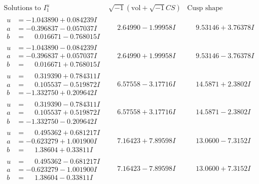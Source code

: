 \documentclass[1p]{elsarticle_modified}
\theoremstyle{definition}
\newcommand{\I}{\sqrt{-1}}
\begin{document}
$$\begin{array}{c|c|c}  
\text{Solutions to }I^u_{1}& \I (\text{vol} + \sqrt{-1}CS) & \text{Cusp shape}\\
 \hline 
\begin{aligned}
u &= -1.043890 + 0.084239 I \\
a &= -0.396837 - 0.057037 I \\
b &= \phantom{-}0.016671 - 0.768015 I\end{aligned}
 & \phantom{-}2.64990 - 1.99958 I & \phantom{-}9.53146 + 3.76378 I \\ \hline\begin{aligned}
u &= -1.043890 - 0.084239 I \\
a &= -0.396837 + 0.057037 I \\
b &= \phantom{-}0.016671 + 0.768015 I\end{aligned}
 & \phantom{-}2.64990 + 1.99958 I & \phantom{-}9.53146 - 3.76378 I \\ \hline\begin{aligned}
u &= \phantom{-}0.319390 + 0.784311 I \\
a &= \phantom{-}0.105537 - 0.519872 I \\
b &= -1.332750 + 0.209642 I\end{aligned}
 & \phantom{-}6.57558 - 3.17716 I & \phantom{-}14.5871 + 2.3802 I \\ \hline\begin{aligned}
u &= \phantom{-}0.319390 - 0.784311 I \\
a &= \phantom{-}0.105537 + 0.519872 I \\
b &= -1.332750 - 0.209642 I\end{aligned}
 & \phantom{-}6.57558 + 3.17716 I & \phantom{-}14.5871 - 2.3802 I \\ \hline\begin{aligned}
u &= \phantom{-}0.495362 + 0.681217 I \\
a &= -0.623279 + 1.001900 I \\
b &= \phantom{-}1.38604 + 0.33811 I\end{aligned}
 & \phantom{-}7.16423 + 7.89598 I & \phantom{-}13.0600 - 7.3152 I \\ \hline\begin{aligned}
u &= \phantom{-}0.495362 - 0.681217 I \\
a &= -0.623279 - 1.001900 I \\
b &= \phantom{-}1.38604 - 0.33811 I\end{aligned}
 & \phantom{-}7.16423 - 7.89598 I & \phantom{-}13.0600 + 7.3152 I \\ \hline\begin{aligned}

\end{aligned}
\end{array}$$
\end{document}
